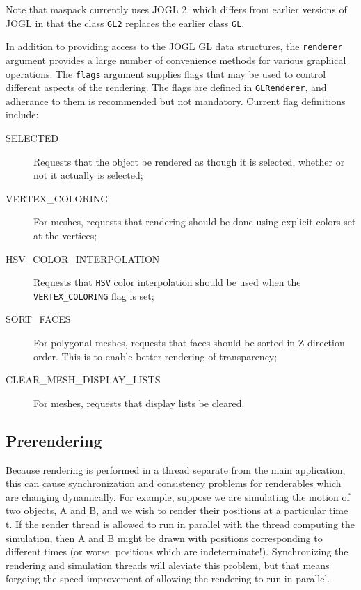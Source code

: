 \documentclass{article}
\begin{document}
\begin{sideblock}
Note that maspack currently uses JOGL 2, which differs from earlier versions of
JOGL in that the class {\tt GL2} replaces the earlier class {\tt GL}.
\end{sideblock}

In addition to providing access to the JOGL GL data structures, the
{\tt renderer} argument provides a large number of convenience methods
for various graphical operations. The {\tt flags} argument supplies
flags that may be used to control different aspects of the rendering.
The flags are defined in {\tt GLRenderer}, and adherance to them is
recommended but not mandatory. Current flag definitions include:

\begin{description}

\item[SELECTED] \mbox{} 
Requests that the object be rendered as though it
is selected, whether or not it actually is selected;

\item[VERTEX\_COLORING] \mbox{}
For meshes, requests that rendering should
be done using explicit colors set at the vertices;

\item[HSV\_COLOR\_INTERPOLATION] \mbox{} 
Requests that {\tt HSV} color
interpolation should be used when the {\tt VERTEX\_COLORING}
flag is set;

\item[SORT\_FACES] \mbox{} 
For polygonal meshes, requests that faces should
be sorted in Z direction order. This is to enable better rendering of
transparency;

\item[CLEAR\_MESH\_DISPLAY\_LISTS] \mbox{} 
For meshes, requests that display
lists be cleared.

\end{description}

\subsection{Prerendering}
\label{PrerenderingSec}

Because rendering is performed in a thread separate from the main
application, this can cause synchronization and consistency problems
for renderables which are changing dynamically. For example, suppose we
are simulating the motion of two objects, A and B, and we wish to
render their positions at a particular time t. If the render thread is
allowed to run in parallel with the thread computing the simulation,
then A and B might be drawn with positions corresponding to different
times (or worse, positions which are indeterminate!). Synchronizing
the rendering and simulation threads will aleviate this problem, but
that means forgoing the speed improvement of allowing the rendering to
run in parallel.
\end{document}
